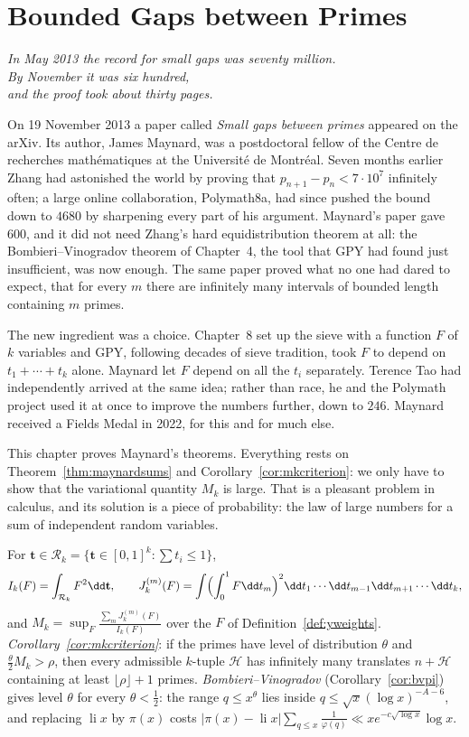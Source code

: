 \chapter{Bounded Gaps between Primes}
\begin{center}\itshape
In May 2013 the record for small gaps was seventy million.\\
By November it was six hundred,\\
and the proof took about thirty pages.
\end{center}

On 19 November 2013 a paper called \emph{Small gaps between primes} appeared on the arXiv. Its author, James Maynard, was a postdoctoral fellow of the Centre de recherches mathématiques at the Université de Montréal. Seven months earlier Zhang had astonished the world by proving that $p_{n+1}-p_n<7\cdot10^7$ infinitely often; a large online collaboration, Polymath8a, had since pushed the bound down to $4680$ by sharpening every part of his argument. Maynard's paper gave $600$, and it did not need Zhang's hard equidistribution theorem at all: the Bombieri--Vinogradov theorem of Chapter~4, the tool that GPY had found just insufficient, was now enough. The same paper proved what no one had dared to expect, that for every $m$ there are infinitely many intervals of bounded length containing $m$ primes.

The new ingredient was a choice. Chapter~8 set up the sieve with a function $F$ of $k$ variables and GPY, following decades of sieve tradition, took $F$ to depend on $t_1+\cdots+t_k$ alone. Maynard let $F$ depend on all the $t_i$ separately. Terence Tao had independently arrived at the same idea; rather than race, he and the Polymath project used it at once to improve the numbers further, down to $246$. Maynard received a Fields Medal in 2022, for this and for much else.

This chapter proves Maynard's theorems. Everything rests on Theorem~\ref{thm:maynardsums} and Corollary~\ref{cor:mkcriterion}: we only have to show that the variational quantity $M_k$ is large. That is a pleasant problem in calculus, and its solution is a piece of probability: the law of large numbers for a sum of independent random variables.

\begin{reminder}
For $\mathbf t\in\mathcal R_k=\{\mathbf t\in[0,1]^k:\sum t_i\le1\}$,
\[
I_k(F)=\int_{\mathcal R_k}F^2\dd\mathbf t,\qquad J_k^{(m)}(F)=\int\Bigl(\int_0^1F\dd t_m\Bigr)^2\dd t_1\cdots\dd t_{m-1}\dd t_{m+1}\cdots\dd t_k,
\]
and $M_k=\sup_F\frac{\sum_mJ_k^{(m)}(F)}{I_k(F)}$ over the $F$ of Definition~\ref{def:yweights}. \emph{Corollary~\ref{cor:mkcriterion}}: if the primes have level of distribution $\theta$ and $\frac\theta2M_k>\rho$, then every admissible $k$-tuple $\mathcal H$ has infinitely many translates $n+\mathcal H$ containing at least $\lfloor\rho\rfloor+1$ primes. \emph{Bombieri--Vinogradov} (Corollary~\ref{cor:bvpi}) gives level $\theta$ for every $\theta<\frac12$: the range $q\le x^\theta$ lies inside $q\le\sqrt x(\log x)^{-A-6}$, and replacing $\operatorname{li}x$ by $\pi(x)$ costs $|\pi(x)-\operatorname{li}x|\sum_{q\le x}\frac1{\varphi(q)}\ll x e^{-c\sqrt{\log x}}\log x$.
\end{reminder}

